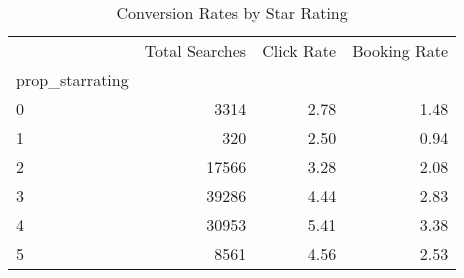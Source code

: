 \begin{table}
\caption{Conversion Rates by Star Rating}
\label{tab:conversion_rates}
\begin{tabular}{lrrr}
\toprule
 & Total Searches & Click Rate & Booking Rate \\
prop_starrating &  &  &  \\
\midrule
0 & 3314 & 2.78 & 1.48 \\
1 & 320 & 2.50 & 0.94 \\
2 & 17566 & 3.28 & 2.08 \\
3 & 39286 & 4.44 & 2.83 \\
4 & 30953 & 5.41 & 3.38 \\
5 & 8561 & 4.56 & 2.53 \\
\bottomrule
\end{tabular}
\end{table}

